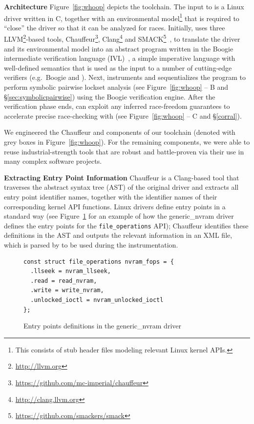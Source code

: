 \noindent\textbf{Architecture }
%
Figure~\ref{fig:whoop} depicts the \whoop toolchain. The input to \whoop is a Linux driver written in C, together with an environmental model\footnote{This consists of stub header files modeling relevant Linux kernel APIs.} that is required to ``close'' the driver so that it can be analyzed for races. Initially, \whoop uses three LLVM\footnote{\url{http://llvm.org}}-based tools, Chauffeur\footnote{\url{https://github.com/mc-imperial/chauffeur}}, Clang\footnote{\url{http://clang.llvm.org}} and SMACK\footnote{\url{https://github.com/smackers/smack}}~\cite{rakamaric2014smack}, to translate the driver and its environmental model into an abstract program written in the Boogie intermediate verification language (IVL)~\cite{deline2005boogiepl}, a simple imperative language with well-defined semantics that is used as the input to a number of cutting-edge verifiers (e.g.\ Boogie and \corral). Next, \whoop instruments and sequentializes the program to perform symbolic pairwise lockset analysis (see Figure~\ref{fig:whoop} -- B and \S\ref{sec:symbolicpairwise}) using the Boogie verification engine. After the verification phase ends, \whoop can exploit any inferred race-freedom guarantees to accelerate precise race-checking with \corral (see Figure~\ref{fig:whoop} -- C and \S\ref{corral}).

We engineered the Chauffeur and \whoop components of our toolchain (denoted with grey boxes in Figure~\ref{fig:whoop}).  For the remaining components, we were able to reuse industrial-strength tools that are robust and battle-proven via their use in many complex software projects.

\noindent\textbf{Extracting Entry Point Information }
%
Chauffeur is a Clang-based tool that traverses the abstract syntax tree (AST) of the original driver and extracts all entry point identifier names, together with the identifier names of their corresponding kernel API functions. Linux drivers define entry points in a standard way (see Figure~\ref{fig:entrypoints} for an example of how the generic\_nvram driver defines the entry points for the \texttt{file\_operations} API); Chauffeur identifies these definitions in the AST and outputs the relevant information in an XML file, which is parsed by \whoop to be used during the instrumentation.

\begin{figure}[t]
\begin{lstlisting}
const struct file_operations nvram_fops = {
  .llseek = nvram_llseek,
  .read = read_nvram,
  .write = write_nvram,
  .unlocked_ioctl = nvram_unlocked_ioctl
};
\end{lstlisting}
\caption{Entry points definitions in the generic\_nvram driver}
\label{fig:entrypoints}
\end{figure}

